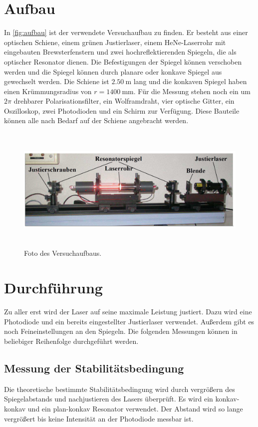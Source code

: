 \section{Aufbau}
\label{sec:Aufbau}
In \autoref{fig:aufbau} ist der verwendete Versuchaufbau zu finden. Er besteht aus einer optischen Schiene, einem
grünen Justierlaser, einem HeNe-Laserrohr mit eingebauten Brewsterfenstern und zwei hochreflektierenden Spiegeln,
die als optischer Resonator dienen. Die Befestigungen der Spiegel können verschoben werden und die Spiegel können
durch planare oder konkave Spiegel aus gewechselt werden. Die Schiene ist $\SI{2,50}{\meter}$ lang und die konkaven
Spiegel haben einen Krümmungsradius von $r=\SI{1400}{\milli\meter}$. Für die Messung stehen noch ein um $2\pi$
drehbarer Polarisationsfilter, ein Wolframdraht, vier optische Gitter, ein Oszilloskop, zwei Photodioden und ein
Schirm zur Verfügung. Diese Bauteile können alle nach Bedarf auf der Schiene angebracht werden.
\begin{figure}
    \centering
    \includegraphics[height=6cm]{content/pics/aufbau.png}
    \caption{Foto des Versuchaufbaus. \cite{V61}}
    \label{fig:aufbau}
\end{figure}

\section{Durchführung}
\label{sec:Durchführung}
Zu aller erst wird der Laser auf seine maximale Leistung justiert. Dazu wird eine Photodiode und ein bereits
eingestellter Justierlaser verwendet. Außerdem gibt es noch Feineinstellungen an den Spiegeln.
Die folgenden Messungen können in beliebiger Reihenfolge durchgeführt werden.

\subsection{Messung der Stabilitätsbedingung}
Die theoretische bestimmte Stabilitätsbedingung wird durch vergrößern des Spiegelabstands und nachjustieren des
Lasers überprüft. Es wird ein konkav-konkav und ein plan-konkav Resonator verwendet. Der Abstand wird so lange
vergrößert bis keine Intensität an der Photodiode messbar ist.

